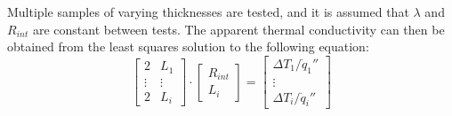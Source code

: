 Multiple samples of varying thicknesses are tested, and it is assumed that \(\lambda\) and \(R_{int}\) are constant between tests.  The apparent thermal conductivity can then be obtained from the least squares solution to the following equation:
\begin{equation}
\left[ \begin{array}{cc}
2 & L_1\\
\vdots & \vdots\\
2 & L_i
\end{array} \right]
\cdot
\left[ \begin{array}{c}
R_{int} \\  L_i
\end{array} \right] = 
\left[ \begin{array}{c}
\Delta T_1/\dot{q}_1'' \\ \vdots \\ \Delta T_i/\dot{q}_i''
\end{array} \right]
\label{eqn:LeastSquaresRintAndLambda}
\end{equation}
